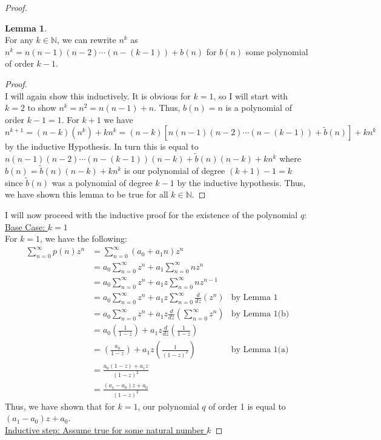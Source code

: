 \documentclass[10pt,a4paper]{article}
\theoremstyle{definition}
\newtheorem{lemma}{Lemma}
\begin{document}
\begin{proof}
\begin{lemma}{$ $}
\\For any $k \in \mathbb{N}$, we can rewrite $n^k$ as $n^k = n(n-1)(n-2)\cdots(n-(k - 1)) + b(n)$ for $b(n)$ some polynomial of order $k - 1$.
\end{lemma}
\begin{proof}{$ $}
\\I will again show this inductively. It is obvious for $k = 1$, so I will start with $k = 2$ to show $n^k = n^2 = n(n - 1) + n$. Thus, $b(n) = n$ is a polynomial of order $k - 1 = 1$. For $k + 1$ we have $n^{k + 1} = (n - k)(n^k) + kn^k = (n - k)[n(n-1)(n-2)\cdots(n - (k-1)) + \tilde{b}(n)] + kn^k$ by the inductive Hypothesis. In turn this is equal to $n(n-1)(n -2)\cdots(n - (k-1))(n - k) + \tilde{b}(n)(n - k) + kn^k$ where $b(n) = \tilde{b}(n)(n - k) + kn^k$ is our polynomial of degree $(k + 1) - 1  =k$ since $\tilde{b}(n)$ was a polynomial of degree $k - 1$ by the inductive hypothesis. Thus, we have shown this lemma to be true for all $k \in \mathbb{N}$.
\end{proof}
I will now proceed with the inductive proof for the existence of the polynomial $q$:
\\\underline{Base Case: $k = 1$}
\\For $k = 1$, we have the following:
\begin{align*}
\sum_{n = 0}^{\infty} p(n)z^n &= \sum_{n = 0}^{\infty} (a_0 + a_1n)z^n\\
&= a_0 \sum_{n = 0}^{\infty}z^n + a_1\sum_{n = 0}^{\infty} nz^n\\
&= a_0 \sum_{n = 0}^{\infty}z^n + a_1z \sum_{n = 0}^{\infty} nz^{n-1}\\
&= a_0 \sum_{n = 0}^{\infty}z^n + a_1z \sum_{n = 0}^{\infty} \frac{d}{dz}(z^n) &\text{by Lemma 1}\\
&= a_0 \sum_{n = 0}^{\infty}z^n + a_1z \frac{d}{dz}\left(\sum_{n = 0}^{\infty} z^n \right) &\text{by Lemma 1(b)}\\
&= a_0 \left(\frac{1}{1-z}\right) + a_1z \frac{d}{dz}\left(\frac{1}{1-z}\right)\\
&= \left(\frac{a_0}{1-z}\right) + a_1z \left(\frac{1}{(1-z)^2}\right) &\text{by Lemma 1(a)}\\
&= \frac{a_0(1- z) + a_1z}{(1 - z)^2}\\
&= \frac{(a_1 - a_0)z + a_0}{(1 - z)^2}
\end{align*}
Thus, we have shown that for $k = 1$, our polynomial $q$ of order 1 is equal to $(a_1 - a_0)z + a_0$.
\\\underline{Inductive step: Assume true for some natural number $k$}

\end{proof}
\end{document}
